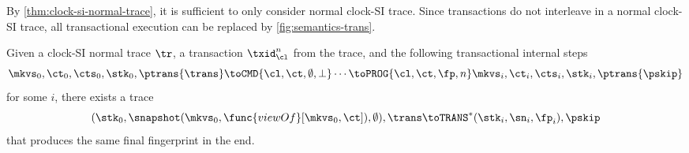 By \cref{thm:clock-si-normal-trace}, it is sufficient to only consider normal clock-SI trace.
Since transactions do not interleave in a normal clock-SI trace,
all transactional execution can be replaced by \cref{fig:semantics-trans}.
\begin{theorem}[Simulation]
    \label{thm:clock-si-transaction-to-atomic}
    Given a clock-SI normal trace \( \tr \), a transaction \( \txid_\cl^n \) from the trace,
    and the following transactional internal steps
    \[
        \mkvs_0, \ct_0, \cts_0, \stk_0, \ptrans{\trans} \toCMD{\cl,\ct,\emptyset,\perp} \cdots  \toPROG{\cl,\ct,\fp,n} \mkvs_i, \ct_i, \cts_i, \stk_i, \ptrans{\pskip}
    \]
    for some \( i \), there exists a trace
    \[
        (\stk_0, \snapshot(\mkvs_0,\func{viewOf}[\mkvs_0,\ct]), \emptyset), \trans \toTRANS^*
        (\stk_i, \sn_i, \fp_i), \pskip
    \]
    that produces the same final fingerprint in the end.
\end{theorem}
